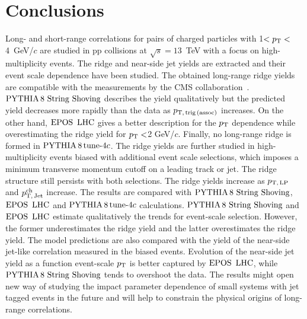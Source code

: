
\section{Conclusions}
\label{sec:summary}

Long- and short-range correlations for pairs of charged particles with 1$ < p_\mathrm{T} < $4~GeV/$c$ are studied in pp collisions at $\sqrt{s} = 13$~TeV with a focus on high-multiplicity events. The ridge and near-side jet yields are extracted and their event scale dependence have been studied. The obtained long-range ridge yields are compatible with the measurements by the CMS collaboration~\cite{Khachatryan:2015lva}.
${\mathrm{PYTHIA}\,8~\mathrm{String}~}\mathrm{Shoving}$ describes the yield qualitatively but the predicted yield decreases more rapidly than the data as $p_\mathrm{T,\,trig\,(assoc)}$ increases. On the other hand, ${\mathrm{EPOS}\,~\mathrm{LHC}}$ gives a better description for the $p_\mathrm{T}$ dependence while overestimating the ridge yield for $p_\mathrm{T}<$2 GeV/$c$. Finally, no long-range ridge is formed in $\mathrm{PYTHIA}\,8\,\mathrm{tune}{\text -}4c$.
The ridge yields are further studied in high-multiplicity events biased with additional event scale selections, which imposes a minimum transverse momentum cutoff on a leading track or jet. The ridge structure still persists with both selections. The ridge yields increase as $p_\mathrm{T,\,LP}$ and $p_\mathrm{T,\,Jet}^\mathrm{ch}$ increase. The results are compared with ${\mathrm{PYTHIA}\,8~\mathrm{String}~}\mathrm{Shoving}$, ${\mathrm{EPOS}\,~\mathrm{LHC}}$ and $\mathrm{PYTHIA}\,8\,\mathrm{tune}{\text -}4c$ calculations. ${\mathrm{PYTHIA}\,8~\mathrm{String}~}\mathrm{Shoving}$ and ${\mathrm{EPOS}\,~\mathrm{LHC}}$ estimate qualitatively the trends for event-scale selection. However, the former underestimates the ridge yield and the latter overestimates the ridge yield. The model predictions are also compared with the yield of the near-side jet-like correlation measured in the biased events. Evolution of the near-side jet yield as a function event-scale $p_\mathrm{T}$ is better captured by ${\mathrm{EPOS}\,~\mathrm{LHC}}$, while ${\mathrm{PYTHIA}\,8~\mathrm{String}~}\mathrm{Shoving}$ tends to overshoot the data. 
The results might open new way of studying the impact parameter dependence of small systems with jet tagged events in the future and will help to constrain the physical origins of long-range correlations.
